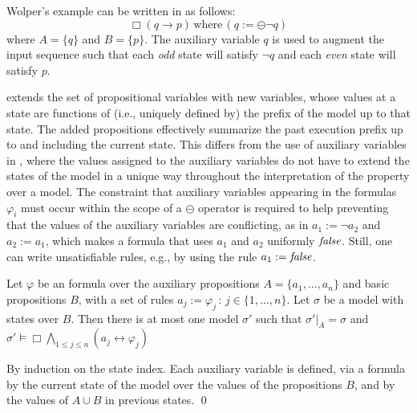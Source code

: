 \noindent
Wolper's example can be written in \ELTL{}
as follows:
\begin{equation} 
\label{form3}
\Box ( q \rightarrow p ) \, \mathrm{where} \, 
 ( q := \ominus \neg q)
\end{equation}
where $A = \{ q\}$ and $B = \{ p \}$.
The auxiliary variable $q$ is used to augment the input sequence such that each {\em odd} state will satisfy $\neg q$
and each {\em even} state will satisfy $p$.  


\ELTL{} extends the set of propositional variables with new variables, whose values at a state are
functions of (i.e., uniquely defined by) the prefix of the model up to that state. The added propositions effectively summarize the past execution prefix up to and
including the current state.
This differs from 
the use of auxiliary variables in \QLTL{}, where the values assigned to the
auxiliary variables do not have to extend the 
states of the model in a unique way throughout the interpretation of 
the property over a model. The constraint that auxiliary variables appearing in the formulas $\varphi_i$ 
must occur within the scope of a $\ominus$ operator
is required to help preventing that the values
of the auxiliary variables are conflicting, as in
$a_1 := \neg a_2$ and $a_2 := a_1$, which makes a formula
that uses $a_1$ and $a_2$ uniformly $\mathit{false}$. Still, one can write unsatisfiable rules, e.g., by using the rule $a_1 : = \mathit{false}$.

\begin{lemma} \label{fourone}
Let $\varphi$ be an \ELTL{} formula
over the auxiliary propositions $A = \{ a_1 , \ldots , a_n \}$ and basic propositions $B$, with
a set of rules $a_j  := \varphi_j \, : \, 
 {j \in \{1, \ldots , n\}}$. 
Let $\sigma$ be a model with states over $B$. 
Then there is at most one
model $\sigma'$ such that $\sigma' |_A = \sigma$ and $\sigma' \models \Box \bigwedge_{1 \leq j \leq n} ( a_j \leftrightarrow \varphi_j) $


\end{lemma}


 By induction on the state index. Each auxiliary variable
is defined, via a \PLTL{} formula by the current state of the model over the values of the propositions $B$, and by the values of $A \cup B$ in previous states.  \qed


